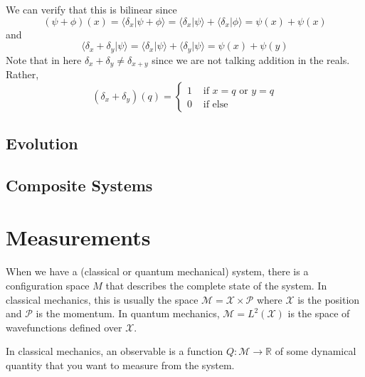 \documentclass{article}
\newcommand{\braket}[2]{\langle #1 | #2 \rangle}
\begin{document}
      We can verify that this is bilinear since
      \begin{equation} 
        (\psi + \phi)(x) = \braket{\delta_x}{\psi + \phi} = \braket{\delta_x}{\psi} + \braket{\delta_x}{\phi} = \psi(x) + \psi(x)
      \end{equation}
      and 
      \begin{equation} 
        \braket{\delta_x + \delta_y}{\psi} = \braket{\delta_x}{\psi} + \braket{\delta_y}{\psi} = \psi(x) + \psi(y)
      \end{equation}
      Note that in here $\delta_x + \delta_y \neq \delta_{x + y}$ since we are not talking addition in the reals. Rather, 
      \begin{equation} 
        (\delta_x + \delta_y)(q) = \begin{cases} 1 & \text{ if } x = q \text{ or } y = q \\ 0 & \text{ if else} \end{cases}
      \end{equation}

    \subsection{Evolution} 


    \subsection{Composite Systems}


\section{Measurements}

  When we have a (classical or quantum mechanical) system, there is a configuration space $M$ that describes the complete state of the system. In classical mechanics, this is usually the space $\mathcal{M} = \mathcal{X} \times \mathcal{P}$ where $\mathcal{X}$ is the position and $\mathcal{P}$ is the momentum. In quantum mechanics, $\mathcal{M} = L^2(\mathcal{X})$ is the space of wavefunctions defined over $\mathcal{X}$. 

  \begin{definition}
    In classical mechanics, an observable is a function $Q: \mathcal{M} \rightarrow \mathbb{R}$ of some dynamical quantity that you want to measure from the system.  
  \end{definition}
\end{document}
